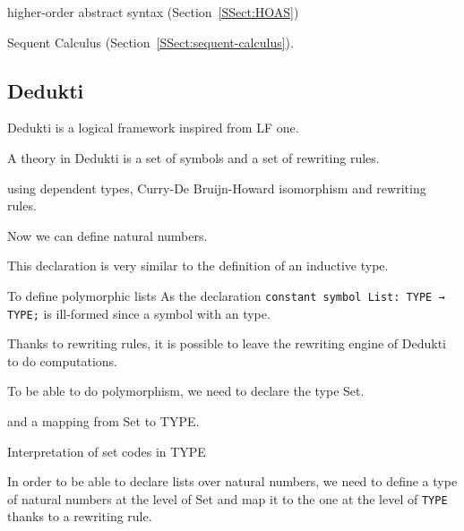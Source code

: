 \documentclass{article}
\begin{document}
	higher-order abstract syntax (Section~\ref{SSect:HOAS})

	Sequent Calculus (Section~\ref{SSect:sequent-calculus}).

	\subsection{Dedukti}\label{SSect:Dedukti}
	
	Dedukti is a logical framework inspired from LF one.
	
	A theory in Dedukti is a set of symbols and a set of rewriting rules.
	
	using dependent types, Curry-De Bruijn-Howard isomorphism and rewriting rules.
	

	
	
	Now we can define natural numbers.
	
	
	
	This declaration is very similar to the definition of an inductive type.
	
	
	To define polymorphic lists
	As the declaration \lstinline[language=Dialekto, firstnumber=last]|constant symbol List: TYPE → TYPE;| is ill-formed since  a symbol with an  type.
	
	
	Thanks to rewriting rules, it is possible to leave the rewriting engine of Dedukti to do computations.
	
	To be able to do polymorphism, we need to declare the type \textsf{Set}.
	
	
	
	and a mapping from \textsf{Set} to TYPE.
	
	Interpretation of set codes in TYPE
	
	
	
	

	
	
	
	
	
	
	
	In order to be able to declare lists over natural numbers, we need to define a type of natural numbers at the level of \textsf{Set} and map it to the one at the level of \lstinline[language=Dialekto, firstnumber=last]|TYPE| thanks to a rewriting rule.
	
\end{document}

